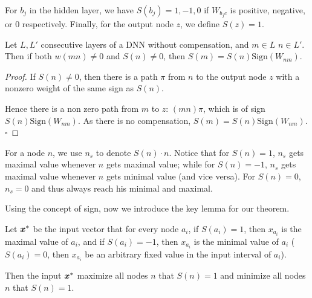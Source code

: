 	For $b_j$ in the hidden layer, we have $S(b_j)=1,-1,0$ if $W_{b_j c}$ is positive, negative, or 0 respectively. Finally, for the output node $z$, we define $S(z)=1$.
	

	
	\begin{lemma}[Sign]
		\label{lemma1}
		Let $L,L'$  consecutive layers of a DNN without compensation, 
		and $m\in L$ $n\in L'$. Then if both 
		$w(m n) \neq 0$ and $S(n) \neq 0$, then 
		$S(m)=S(n)\mathrm{Sign}(W_{n m})$.
	\end{lemma}
	
	\begin{proof}
		If $S(n) \neq 0$, then there is a path $\pi$ from $n$ to the output node $z$ with a nonzero weight of the same sign as $S(n)$. 
		
		Hence there is a non zero path from $m$ to $z$: $(m n) \pi$, which is of sign 
		$S(n)\mathrm{Sign}(W_{n m})$. As there is no compensation, $S(m)=S(n)\mathrm{Sign}(W_{n m})$.
		\hfill $\square$
	\end{proof}
	
	
	For a node $n$, we use $n_s$ to denote $S(n)\cdot n$. 
	Notice that for $S(n)=1$, $n_s$ gets maximal value whenever $n$ gets maximal value; 
	while for $S(n)=-1$, $n_s$ gets maximal value whenever $n$ gets minimal value (and vice versa). For $S(n)=0$, $n_s=0$ and thus always reach his minimal and maximal.
	
	Using the concept of sign, now we introduce the key lemma for our theorem.
	
	\begin{lemma}\label{lem:key1}
		
		Let $\boldsymbol{x}^{*}$ be the input vector that for every node $a_i$, if $S(a_i)=1$, then $x_{a_i}$ is the maximal value of $a_i$, and if $S(a_i)=-1$, then $x_{a_i}$ is the minimal value of $a_i$ ($S(a_i)=0$, then $x_{a_i}$ be an arbitrary fixed value in the input interval of $a_i$).
		
		Then the input $\boldsymbol{x}^*$ maximize all nodes $n$ that $S(n)=1$ and minimize all nodes $n$ that $S(n)=1$.
	\end{lemma}
	
